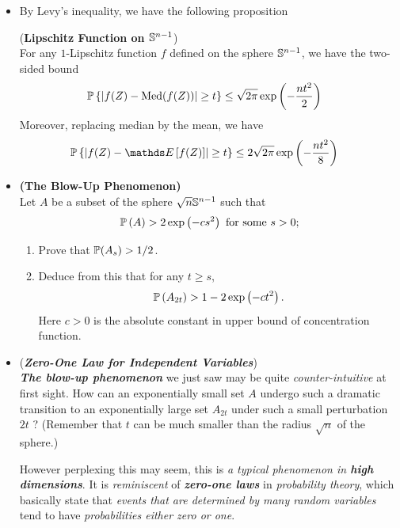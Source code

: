 \documentclass[11pt]{article}
\begin{document}
\begin{itemize}
\item By Levy's inequality, we have the following proposition
\begin{proposition} (\textbf{Lipschitz Function on ${\mathbb S}^{n-1}$}) \citep{wainwright2019high}\\
For any $1$-Lipschitz function $f$ defined on the sphere ${\mathbb S}^{n-1}$, we have the two-sided bound
\begin{align}
{\mathbb P}\left\{\left\lvert f(Z) - \text{Med}(f(Z)) \right\rvert \ge t\right\} &\le \sqrt{2\pi}\exp\left(-\frac{n t^2}{2}\right) \label{ineqn: lipschitz_unit_sphere_median}
\end{align} Moreover, replacing median by the mean, we have 
\begin{align}
\bP\set{\abs{f(Z) - \E{}{f(Z)} } \ge t} &\le 2\sqrt{2\pi}\exp\paren{-\frac{n t^2}{8}} \label{ineqn: lipschitz_unit_sphere_mean}
\end{align}
\end{proposition}

\item \begin{exercise} \textbf{(The Blow-Up Phenomenon)}\\
Let $A$ be a subset of the sphere $\sqrt{n} {\mathbb S}^{n-1}$ such that
\begin{align*}
{\mathbb P}\left(A\right) > 2 \exp\left(-c s^2\right) \text{ for some }s > 0;
\end{align*}
\begin{enumerate}
\item Prove that ${\mathbb P}(A_s) > 1/2$.
\item Deduce from this that for any $t \ge s$,
\begin{align*}
{\mathbb P}\left(A_{2t}\right) > 1 - 2 \exp\left(-c t^2\right).
\end{align*} Here $c > 0$ is the absolute constant in upper bound of concentration function.
\end{enumerate}
\end{exercise}

\item \begin{remark} (\textbf{\emph{Zero-One Law for Independent Variables}}) \citep{vershynin2018high}\\
\emph{\textbf{The blow-up phenomenon}} we just saw may be quite \emph{counter-intuitive} at first sight. How can an exponentially small set $A$ undergo such a dramatic transition to an exponentially large set $A_{2t}$ under such a small perturbation $2t$ ? (Remember that $t$ can be much smaller than the radius $\sqrt{n}$ of the sphere.) 

However perplexing this may seem, this is \emph{a typical phenomenon in \textbf{high dimensions}}. It is \emph{reminiscent} of \textbf{\emph{zero-one laws}} in
\emph{probability theory}, which basically state that \emph{events that are determined by many random variables} tend to have \emph{probabilities either zero or one}.
\end{remark}
\end{itemize}
\end{document}
